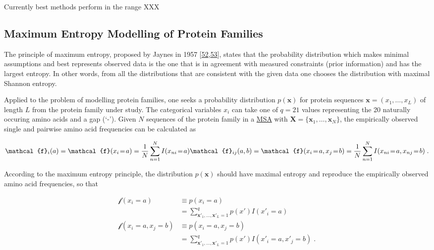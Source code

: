 \documentclass[12pt,a4paper,twoside]{book}
\newcommand{\eq}{\!=\!}
\newcommand{\seq}{\mathbf{x}}
\newcommand{\X}{\mathbf{X}}
\theoremstyle{definition}
\theoremstyle{definition}
\theoremstyle{remark}
\begin{document}
Currently best methods perform in the range XXX

\subsection{Maximum Entropy Modelling of Protein Families}\label{maxent}

The principle of maximum entropy, proposed by Jaynes in 1957
{[}\protect\hyperlink{ref-Jaynes1957a}{52},\protect\hyperlink{ref-Jaynes1957b}{53}{]},
states that the probability distribution which makes minimal assumptions
and best represents observed data is the one that is in agreement with
measured constraints (prior information) and has the largest entropy. In
other words, from all the distributions that are consistent with the
given data one chooses the distribution with maximal Shannon entropy.

Applied to the problem of modelling protein families, one seeks a
probability distribution \(p(\seq)\) for protein sequences
\(\seq = (x_1, \ldots, x_L)\) of length \(L\) from the protein family
under study. The categorical variables \(x_{i}\) can take one of
\(q=21\) values representing the 20 naturally occuring amino acids and a
gap (`-'). Given \(N\) sequences of the protein family in a
\protect\hyperlink{abbrev}{MSA} with
\(\X = \{ \seq_1, \ldots, \seq_N \}\), the empirically observed single
and pairwise amino acid frequencies can be calculated as

\begin{equation}
    \mathcal{f}_i(a) = \mathcal{f}(x_i\eq a) = \frac{1}{N}\sum_{n=1}^N I(x_{ni} \eq a) \\
    \mathcal{f}_{ij}(a,b) = \mathcal{f}(x_i\eq a, x_j\eq b) = \frac{1}{N} \sum_{n=1}^N I(x_{ni} \eq a, x_{nj} \eq b) \; .
 \label{eq:emp-freq}
\end{equation}

According to the maximum entropy principle, the distribution \(p(\seq)\)
should have maximal entropy and reproduce the empirically observed amino
acid frequencies, so that

\begin{align}
   \mathcal{f}(x_i\eq a)            &\equiv p(x_i\eq a)  \\
                                    &= \sum_{\seq\prime_1, \ldots, \seq\prime_L = 1}^{q} p(x\prime) I(x\prime_i \eq a) \\
  \mathcal{f}(x_i\eq a, x_j\eq b)   &\equiv p(x_i\eq a, x_j \eq b) \\
                                    &= \sum_{\seq\prime_1, \ldots, \seq\prime_L = 1}^{q}  p(x\prime) I(x\prime_i\eq a, x\prime_j \eq b)  \; .
 \label{eq:maxent-reproducing-emp-freq}
\end{align}
\end{document}
